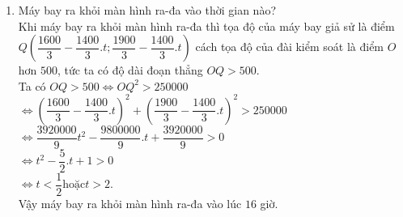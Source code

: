 \begin{bt}
{\begin{enumerate}
Ta tính được \\
$OP^2= \left( \dfrac{{1600}}{3} - \dfrac{{1400}}{3}.t\right) ^2+\left(\dfrac{{1900}}{3} - \dfrac{{1400}}{3}.t \right) ^2 $\\
$ = \dfrac{{3920000}}{9}t^2 - \dfrac{{9800000}}{9}.t+\dfrac{6170000}{9}$ \\
$ = \dfrac{{3920000}}{9}\left( t^2 - \dfrac{{5}}{2}t\right) +\dfrac{6170000}{9}$ \\
$ = \dfrac{{3920000}}{9}\left( t^2 - \dfrac{{5}}{2}t+\dfrac{25}{16}\right) +500$ \\
$ = \dfrac{{3920000}}{9}\left( t - \dfrac{5}{4}\right)^2 +5000 \geq 5000$ \\
Dấu bằng xảy ra khi và chỉ khi $\left( t - \dfrac{5}{4}\right)^2=0 \Leftrightarrow t=\dfrac{5}{4}$.\\
Vậy lúc $15$ giờ $15$ phút thì máy bay gần đài kiểm soát không lưu nhất. Khoảng cách giữa máy bay và đài kiểm soát lúc đó là $50\sqrt{2}\;$ km.
\item Máy bay ra khỏi màn hình ra-đa vào thời gian nào?\\
Khi máy bay ra khỏi màn hình ra-đa thì tọa độ của máy bay giả sử là điểm $Q\left( \dfrac{{1600}}{3} - \dfrac{{1400}}{3}.t; \dfrac{{1900}}{3} - \dfrac{{1400}}{3}.t \right) $ cách tọa độ của đài kiểm soát là điểm $O$ hơn $500$, tức ta có độ dài đoạn thẳng $OQ>500$.\\
Ta có $OQ>500 \Leftrightarrow OQ^2 > 250000$\\
$ \Leftrightarrow \left( \dfrac{{1600}}{3} - \dfrac{{1400}}{3}.t\right) ^2+\left(\dfrac{{1900}}{3} - \dfrac{{1400}}{3}.t \right) ^2 >250000$ \\
$ \Leftrightarrow \dfrac{{3920000}}{9}t^2 - \dfrac{{9800000}}{9}.t+\dfrac{3920000}{9}>0$ \\
$ \Leftrightarrow t^2 - \dfrac{{5}}{2}.t+1>0$ \\
$ \Leftrightarrow t<\dfrac{1}{2} \text{hoặc} t>2$.\\
Vậy máy bay ra khỏi màn hình ra-đa vào lúc $16$ giờ.
\end{enumerate}
}
\end{bt}

